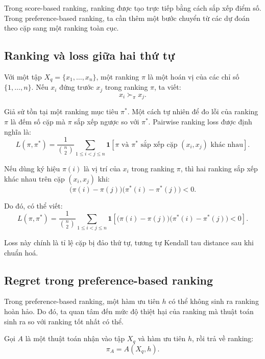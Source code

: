 Trong score-based ranking, ranking được tạo trực tiếp bằng cách sắp xếp điểm số. Trong preference-based ranking, ta cần thêm một bước chuyển từ các dự đoán theo cặp sang một ranking toàn cục.

\subsection{Ranking và loss giữa hai thứ tự}

Với một tập \(X_q=\{x_1,\ldots,x_n\}\), một ranking \(\pi\) là một hoán vị của các chỉ số \(\{1,\ldots,n\}\). Nếu \(x_i\) đứng trước \(x_j\) trong ranking \(\pi\), ta viết:
\[
    x_i \succ_{\pi} x_j.
\]

Giả sử tồn tại một ranking mục tiêu \(\pi^{*}\). Một cách tự nhiên để đo lỗi của ranking \(\pi\) là đếm số cặp mà \(\pi\) sắp xếp ngược so với \(\pi^{*}\). Pairwise ranking loss được định nghĩa là:
\begin{equation}
    L(\pi,\pi^{*})
    =
    \frac{1}{\binom{n}{2}}
    \sum_{1\leq i<j\leq n}
    \mathbf{1}
    \left[
        \pi \text{ và } \pi^{*}
        \text{ sắp xếp cặp } (x_i,x_j) \text{ khác nhau}
    \right].
    \label{eq:section7-pairwise-ranking-loss}
\end{equation}

Nếu dùng ký hiệu \(\pi(i)\) là vị trí của \(x_i\) trong ranking \(\pi\), thì hai ranking sắp xếp khác nhau trên cặp \((x_i,x_j)\) khi:
\[
    \big(\pi(i)-\pi(j)\big)
    \big(\pi^{*}(i)-\pi^{*}(j)\big)<0.
\]

Do đó, có thể viết:
\[
    L(\pi,\pi^{*})
    =
    \frac{1}{\binom{n}{2}}
    \sum_{1\leq i<j\leq n}
    \mathbf{1}
    \left[
        \big(\pi(i)-\pi(j)\big)
        \big(\pi^{*}(i)-\pi^{*}(j)\big)<0
    \right].
\]

Loss này chính là tỉ lệ cặp bị đảo thứ tự, tương tự Kendall tau distance sau khi chuẩn hoá.

\subsection{Regret trong preference-based ranking}

Trong preference-based ranking, một hàm ưu tiên \(h\) có thể không sinh ra ranking hoàn hảo. Do đó, ta quan tâm đến mức độ thiệt hại của ranking mà thuật toán sinh ra so với ranking tốt nhất có thể.

Gọi \(A\) là một thuật toán nhận vào tập \(X_q\) và hàm ưu tiên \(h\), rồi trả về ranking:
\[
    \pi_A=A(X_q,h).
\]

